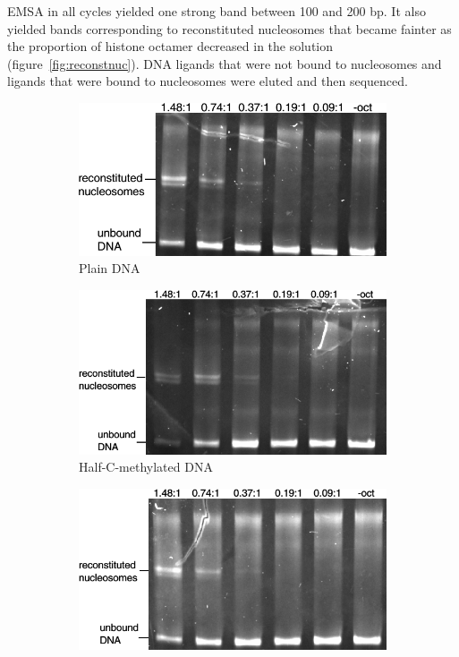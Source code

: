\documentclass[parskip=full, numbers=noenddot]{scrreprt}
\begin{document}
EMSA in all cycles yielded one strong band between 100 and 200 bp. It also yielded bands corresponding to reconstituted nucleosomes that became fainter as the proportion of histone octamer decreased in the solution (figure~\ref{fig:reconstnuc}).  DNA ligands that were not bound to nucleosomes and ligands that were bound to nucleosomes were eluted and then sequenced.

\begin{figure}[h]
  \centering
  \begin{subfigure}[htpb]{0.4\textwidth}
    \centering
    \includegraphics[width=\textwidth]{reconstnuc_a}
    \caption{Plain DNA}
    \label{fig:reconstnuc_a}
  \end{subfigure}
  \begin{subfigure}[htpb]{0.4\textwidth}
    \centering
    \includegraphics[width=\textwidth]{reconstnuc_b}
    \caption{Half-C-methylated DNA}
    \label{fig:reconstnuc_b}
  \end{subfigure}
  \begin{subfigure}[htpb]{0.4\textwidth}
    \centering
    \includegraphics[width=\textwidth]{reconstnuc_c}

\end{subfigure}
\end{figure}
\end{document}
